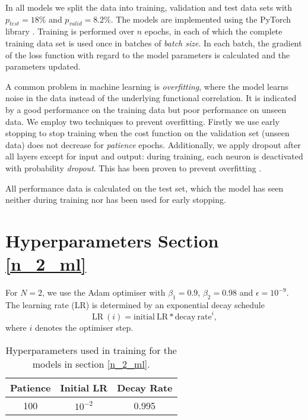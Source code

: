 In all models we split the data into training, validation and test data sets with $p_{test} = 18 \%$ and $p_{valid} = 8.2 \%$.
The models are implemented using the PyTorch library \cite{NEURIPS2019_9015}. 
Training is performed over $n$ epochs, in each of which the complete training data set is used once in batches of \textit{batch size}.
In each batch, the gradient of the loss function with regard to the model parameters is calculated and the parameters updated.

A common problem in machine learning is \textit{overfitting}, where the model learns noise in the data instead of the underlying functional correlation.
It is indicated by a good performance on the training data but poor performance on unseen data.
We employ two techniques to prevent overfitting.
Firstly we use early stopping to stop training when the cost function on the validation set (unseen data) does not decrease for \textit{patience} epochs.
Additionally, we apply dropout after all layers except for input and output:
during training, each neuron is deactivated with probability \textit{dropout}.
This has been proven to prevent overfitting \cite{hinton2012improving}.

All performance data is calculated on the test set, which the model has seen neither during training nor has been used for early stopping.

\section{Hyperparameters Section \ref{n_2_ml}}
For $N=2$, we use the Adam \cite{kingma2017adam} optimiser with $\beta_1 = 0.9$, $\beta_2 = 0.98$ and $\epsilon = 10^{-9}$. The learning rate (LR) is determined by an exponential decay schedule
\begin{equation} \label{eds}
\mathrm{LR} \ (i) = \mathrm{initial \ LR} * \mathrm{decay \ rate}^i,
\end{equation}
where $i$ denotes the optimiser step.


\begin{table}[h]
	\centering
	\begin{tabular}{c | c | c }
		Patience & Initial LR & Decay Rate \\
		\hline
		100 & $10^{-2}$ & 0.995 \\
	\end{tabular}
	\caption{Hyperparameters used in training for the models in section \ref{n_2_ml}.}
	\label{hyperparams_n_2}
\end{table}

